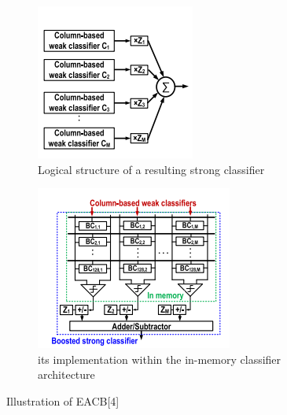 \begin{figure}[h]
\centering
\begin{subfigure}{0.4\textwidth}
\includegraphics[width=1\linewidth]{EACB1.PNG} 
\caption{ Logical structure of a resulting strong classifier}
\label{fig:Figure}
\end{subfigure}

\begin{subfigure}{0.4\textwidth}
\includegraphics[width=1\linewidth]{EACB2.PNG}
\caption{ its implementation within the in-memory classifier architecture}
\label{fig:Figure}
\end{subfigure}
 
\caption{Illustration of EACB[4] }
\label{fig:Figure}
\end{figure}

